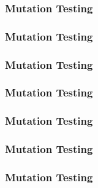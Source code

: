   \begin{frame}
    \frametitle{Mutation Testing}
    
    \begin{figure}[!htb]
    \centering
        \centering
        \vspace*{-3.5cm}
        {\fontsize{50}{50}}
    \end{figure}
    \end{frame}

  \begin{frame}
    \frametitle{Mutation Testing}
    
    \begin{figure}[!htb]
    \centering
        \vspace*{-2.15cm}
        {\fontsize{50}{50}}
        
    \end{figure}
    \end{frame}

  \begin{frame}
    \frametitle{Mutation Testing}
    \centering
    {\fontsize{60}{60}\selectfont{Silver Bullet?}}
  \end{frame}

  \begin{frame}
    \frametitle{Mutation Testing}
    \centering
    {\fontsize{50}{50}\selectfont{Limitations}}
  \end{frame}

  \begin{frame}
    \frametitle{Mutation Testing}
    \begin{figure}[!htb]
    \centering
    \small{}
    \end{figure}
    \end{frame}

  \begin{frame}
    \frametitle{Mutation Testing}
    \centering
    {\fontsize{50}{50}\selectfont{Still $\dots$}}
  \end{frame}

  \begin{frame}
    \frametitle{Mutation Testing}
    \centering
    
  \end{frame}
